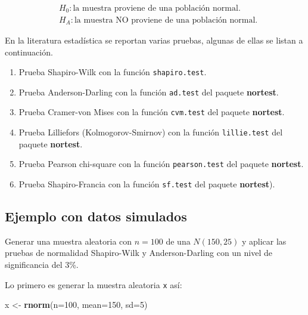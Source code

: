 \documentclass[10pt,]{krantz}
\makeatletter
\newenvironment{Shaded}{\begin{snugshade}}{\end{snugshade}}
\newcommand{\KeywordTok}[1]{\textcolor[rgb]{0.13,0.29,0.53}{\textbf{{#1}}}}
\newcommand{\DataTypeTok}[1]{\textcolor[rgb]{0.13,0.29,0.53}{{#1}}}
\newcommand{\DecValTok}[1]{\textcolor[rgb]{0.00,0.00,0.81}{{#1}}}
\newcommand{\StringTok}[1]{\textcolor[rgb]{0.31,0.60,0.02}{{#1}}}
\newcommand{\NormalTok}[1]{{#1}}
\providecommand{\tightlist}{%
  \setlength{\itemsep}{0pt}\setlength{\parskip}{0pt}}
\newenvironment{kframe}{%
\medskip{}
\setlength{\fboxsep}{.8em}
 \def\at@end@of@kframe{}%
 \ifinner\ifhmode%
  \def\at@end@of@kframe{\end{minipage}}%
  \begin{minipage}{\columnwidth}%
 \fi\fi%
 \def\FrameCommand##1{\hskip\@totalleftmargin \hskip-\fboxsep
 \colorbox{shadecolor}{##1}\hskip-\fboxsep
     \hskip-\linewidth \hskip-\@totalleftmargin \hskip\columnwidth}%
 \MakeFramed {\advance\hsize-\width
   \@totalleftmargin\z@ \linewidth\hsize
   \@setminipage}}%
 {\par\unskip\endMakeFramed%
 \at@end@of@kframe}
\renewenvironment{Shaded}{\begin{kframe}}{\end{kframe}}
\makeatother
\begin{document}
\begin{equation}
\begin{split}
&H_0: \text{la muestra proviene de una población normal.} \\
&H_A: \text{la muestra NO proviene de una población normal.}
\end{split}
\end{equation}

En la literatura estadística se reportan varias pruebas, algunas de
ellas se listan a continuación.

\begin{enumerate}
\def\labelenumi{\arabic{enumi}.}
\tightlist
\item
  Prueba Shapiro-Wilk con la función \texttt{shapiro.test}.
\item
  Prueba Anderson-Darling con la función \texttt{ad.test} del paquete
  \textbf{nortest}.
\item
  Prueba Cramer-von Mises con la función \texttt{cvm.test} del paquete
  \textbf{nortest}.
\item
  Prueba Lilliefors (Kolmogorov-Smirnov) con la función
  \texttt{lillie.test} del paquete \textbf{nortest}.
\item
  Prueba Pearson chi-square con la función \texttt{pearson.test} del
  paquete \textbf{nortest}.
\item
  Prueba Shapiro-Francia con la función \texttt{sf.test} del paquete
  \textbf{nortest}).
\end{enumerate}

\subsection*{Ejemplo con datos
simulados}\label{ejemplo-con-datos-simulados}


Generar una muestra aleatoria con \(n=100\) de una \(N(150, 25)\) y
aplicar las pruebas de normalidad Shapiro-Wilk y Anderson-Darling con un
nivel de significancia del 3\%.

Lo primero es generar la muestra aleatoria \texttt{x} así:

\begin{Shaded}
\begin{Highlighting}[]
\NormalTok{x <-}\StringTok{ }\KeywordTok{rnorm}\NormalTok{(}\DataTypeTok{n=}\DecValTok{100}\NormalTok{, }\DataTypeTok{mean=}\DecValTok{150}\NormalTok{, }\DataTypeTok{sd=}\DecValTok{5}\NormalTok{)}
\end{Highlighting}
\end{Shaded}
\end{document}
